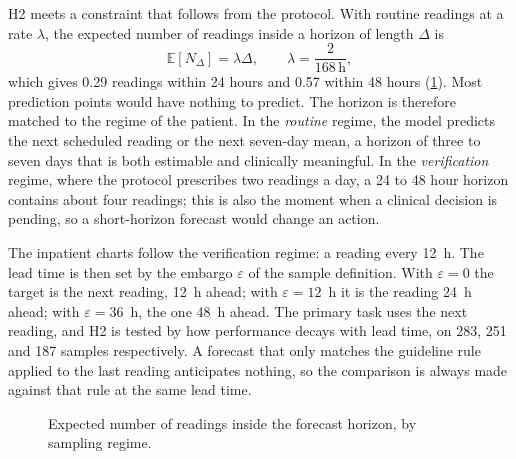 H2 meets a constraint that follows from the protocol. With routine readings at a rate $\lambda$, the expected number of readings inside a horizon of length $\Delta$ is
\begin{equation}
  \mathbb{E}[N_\Delta] = \lambda\Delta, \qquad \lambda = \frac{2}{168\,\text{h}},
\end{equation}
which gives 0.29 readings within 24 hours and 0.57 within 48 hours (\cref{fig:sampling-horizon}). Most prediction points would have nothing to predict. The horizon is therefore matched to the regime of the patient. In the \emph{routine} regime, the model predicts the next scheduled reading or the next seven-day mean, a horizon of three to seven days that is both estimable and clinically meaningful. In the \emph{verification} regime, where the protocol prescribes two readings a day, a 24 to 48 hour horizon contains about four readings; this is also the moment when a clinical decision is pending, so a short-horizon forecast would change an action.

The inpatient charts follow the verification regime: a reading every 12~h. The lead time is then set by the embargo $\varepsilon$ of the sample definition. With $\varepsilon = 0$ the target is the next reading, 12~h ahead; with $\varepsilon = 12$~h it is the reading 24~h ahead; with $\varepsilon = 36$~h, the one 48~h ahead. The primary task uses the next reading, and H2 is tested by how performance decays with lead time, on 283, 251 and 187 samples respectively. A forecast that only matches the guideline rule applied to the last reading anticipates nothing, so the comparison is always made against that rule at the same lead time.

\begin{figure}[htbp]
\centering
{}
\caption{Expected number of readings inside the forecast horizon, by sampling regime.}\label{fig:sampling-horizon}
\end{figure}

